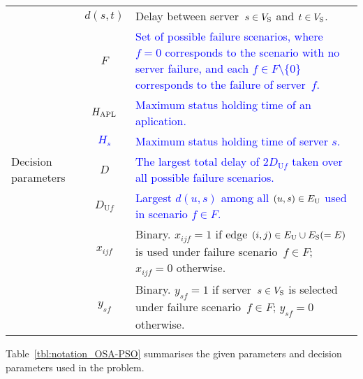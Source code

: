 \documentclass[10pt, letterpaper]{IEEEtran}
\newcommand\blue[1]{\textcolor{blue}{#1}}
\begin{document}
\begin{CJK}{UTF8}{ipxm}
{\begin{table}[tb]
\begin{tabular}{p{1.3cm}|cp{5.4cm}}
        & $d(s,t)$ & Delay between server~$s \in V_{\rm{S}}$ and $t \in V_{\rm{S}}$. \\ 
        & $F$ & \blue{Set of possible failure scenarios, where $f = 0$ corresponds to the scenario with no server failure, and each $f \in F \setminus \{0\}$ corresponds to the failure of server~$f$.} \\
        & \blue{$H_{\rm APL}$} & \blue{Maximum status holding time of an aplication.} \\
        & \blue{$H_s$} & \blue{Maximum status holding time of server $s$.} \\ \hline
        Decision parameters & $D$ & \blue{The largest total delay of $2D_{\mathrm{U}f}$ taken over all possible failure scenarios.} \\
        & $D_{\mathrm{U}f}$ & \blue{Largest $d(u,s)$ among all $(u,s) \in E_{\rm{U}}$ used in scenario $f \in F$.} \\
        & $x_{ijf}$ & Binary. $x_{ijf} = 1$ if edge $(i,j) \in E_{\rm U} \cup E_{\rm S} (=E)$ is used under failure scenario~$f \in F$; $x_{ijf} = 0$ otherwise. \\
        & $y_{sf}$ & Binary. $y_{sf} = 1$ if server~$s \in V_{\rm{S}}$ is selected under failure scenario~$f \in F$; $y_{sf} = 0$ otherwise. \\ \hline
    \end{tabular}
\end{table}
Table~\ref{tbl:notation_OSA-PSO} summarises the given parameters and decision parameters used in the problem.
}


\end{CJK}
\end{document}
